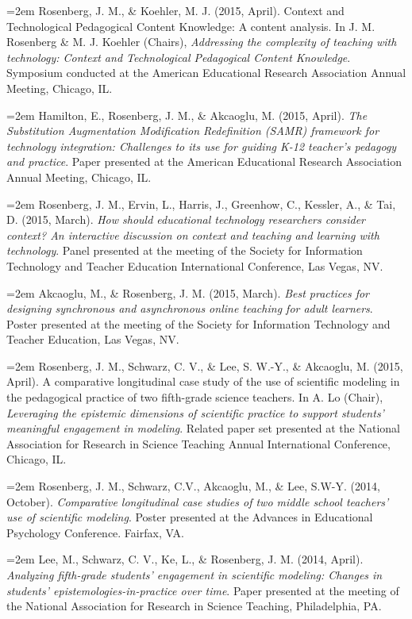 \documentclass[
  14,
]{article}
\begin{document}
\hangindent=2em Rosenberg, J. M., \& Koehler, M. J. (2015, April).
Context and Technological Pedagogical Content Knowledge: A content
analysis. In J. M. Rosenberg \& M. J. Koehler (Chairs), \emph{Addressing
the complexity of teaching with technology: Context and Technological
Pedagogical Content Knowledge}. Symposium conducted at the American
Educational Research Association Annual Meeting, Chicago, IL.

\hangindent=2em Hamilton, E., Rosenberg, J. M., \& Akcaoglu, M. (2015,
April). \emph{The Substitution Augmentation Modification Redefinition
(SAMR) framework for technology integration: Challenges to its use for
guiding K-12 teacher's pedagogy and practice}. Paper presented at the
American Educational Research Association Annual Meeting, Chicago, IL.

\hangindent=2em Rosenberg, J. M., Ervin, L., Harris, J., Greenhow, C.,
Kessler, A., \& Tai, D. (2015, March). \emph{How should educational
technology researchers consider context? An interactive discussion on
context and teaching and learning with technology}. Panel presented at
the meeting of the Society for Information Technology and Teacher
Education International Conference, Las Vegas, NV.

\hangindent=2em Akcaoglu, M., \& Rosenberg, J. M. (2015, March).
\emph{Best practices for designing synchronous and asynchronous online
teaching for adult learners}. Poster presented at the meeting of the
Society for Information Technology and Teacher Education, Las Vegas, NV.

\hangindent=2em Rosenberg, J. M., Schwarz, C. V., \& Lee, S. W.-Y., \&
Akcaoglu, M. (2015, April). A comparative longitudinal case study of the
use of scientific modeling in the pedagogical practice of two
fifth-grade science teachers. In A. Lo (Chair), \emph{Leveraging the
epistemic dimensions of scientific practice to support students'
meaningful engagement in modeling}. Related paper set presented at the
National Association for Research in Science Teaching Annual
International Conference, Chicago, IL.

\hangindent=2em Rosenberg, J. M., Schwarz, C.V., Akcaoglu, M., \& Lee,
S.W-Y. (2014, October). \emph{Comparative longitudinal case studies of
two middle school teachers' use of scientific modeling}. Poster
presented at the Advances in Educational Psychology Conference. Fairfax,
VA.

\hangindent=2em Lee, M., Schwarz, C. V., Ke, L., \& Rosenberg, J. M.
(2014, April). \emph{Analyzing fifth-grade students' engagement in
scientific modeling: Changes in students' epistemologies-in-practice
over time}. Paper presented at the meeting of the National Association
for Research in Science Teaching, Philadelphia, PA.
\end{document}

